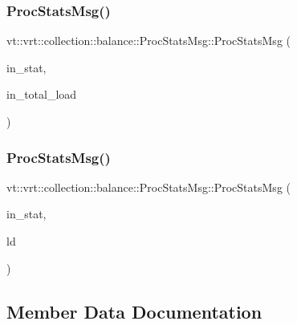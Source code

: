 \subsubsection{\texorpdfstring{Proc\+Stats\+Msg()}{ProcStatsMsg()}\hspace{0.1cm}{\footnotesize\ttfamily [2/3]}}
{\footnotesize\ttfamily vt\+::vrt\+::collection\+::balance\+::\+Proc\+Stats\+Msg\+::\+Proc\+Stats\+Msg (\begin{DoxyParamCaption}\item[{\hyperlink{namespacevt_1_1vrt_1_1collection_1_1lb_af0e20ef9afee77295053aa83bf1348b1}{lb\+::\+Statistic}}]{in\+\_\+stat,  }\item[{\hyperlink{namespacevt_a876a9d0cd5a952859c72de8a46881442}{Time\+Type} const}]{in\+\_\+total\+\_\+load }\end{DoxyParamCaption})\hspace{0.3cm}{\ttfamily [inline]}}

\mbox{\label{structvt_1_1vrt_1_1collection_1_1balance_1_1_proc_stats_msg_a11420fc6d4faf385291097c70aaac452}} 
\subsubsection{\texorpdfstring{Proc\+Stats\+Msg()}{ProcStatsMsg()}\hspace{0.1cm}{\footnotesize\ttfamily [3/3]}}
{\footnotesize\ttfamily vt\+::vrt\+::collection\+::balance\+::\+Proc\+Stats\+Msg\+::\+Proc\+Stats\+Msg (\begin{DoxyParamCaption}\item[{\hyperlink{namespacevt_1_1vrt_1_1collection_1_1lb_af0e20ef9afee77295053aa83bf1348b1}{lb\+::\+Statistic}}]{in\+\_\+stat,  }\item[{\hyperlink{structvt_1_1vrt_1_1collection_1_1balance_1_1_load_data}{Load\+Data} \&\&}]{ld }\end{DoxyParamCaption})\hspace{0.3cm}{\ttfamily [inline]}}



\subsection{Member Data Documentation}
\mbox{\label{structvt_1_1vrt_1_1collection_1_1balance_1_1_proc_stats_msg_ae66687243df03f02aa5e0f5d884cc575}} 
